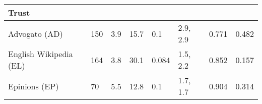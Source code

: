 \begin{longtable}{ llllllll }
\hline
\multicolumn{8}{|l|}{\textbf{Trust}} \\
\hline
Advogato (\textsf{AD})            & 150 & 3.9 & 15.7 & 0.1 & 2.9, 2.9 & 0.771 & 0.482 \\
English Wikipedia (\textsf{EL})   & 164 & 3.8 & 30.1 & 0.084 & 1.5, 2.2 & 0.852 & 0.157 \\
Epinions (\textsf{EP})            & 70 & 5.5 & 12.8 & 0.1 & 1.7, 1.7 & 0.904 & 0.314 \\

      \hline
    \end{longtable} 

